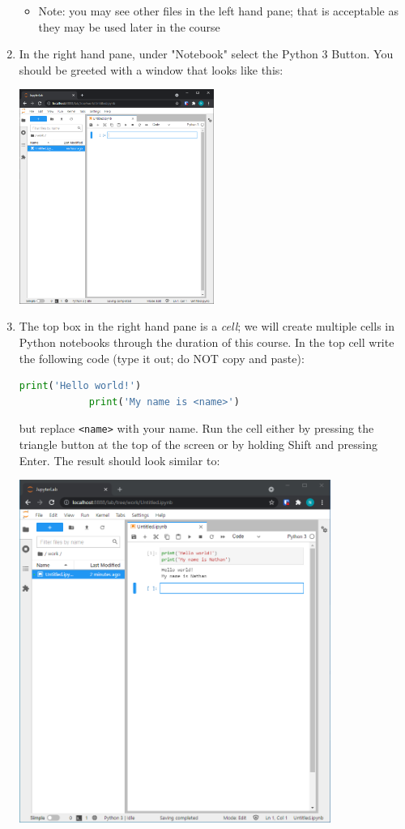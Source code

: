 \documentclass[letterpaper,10pt]{article}
\begin{document}
\begin{enumerate}
\begin{center}
		\end{center}
		\begin{itemize}
			\item Note: you may see other files in the left hand pane; that is acceptable as they may be used later in the course
		\end{itemize}
	\item In the right hand pane, under "Notebook" select the Python 3 Button.  You should be greeted with a window that looks like this:
		\begin{center}
			\includegraphics[width=0.5\textwidth]{new_notebook.PNG}
		\end{center}
	\item The top box in the right hand pane is a \emph{cell}; we will create multiple cells in Python notebooks through the duration of this course.  In the top cell write the following code (type it out; do NOT copy and paste):
		\begin{lstlisting}[language=Python]
			print('Hello world!')
			print('My name is <name>')
		\end{lstlisting}
		but replace \texttt{<name>} with your name.  Run the cell either by pressing the triangle button at the top of the screen or by holding Shift and pressing Enter.  The result should look similar to:
		\begin{center}
			\includegraphics[width=0.8\textwidth]{hello_world.PNG}

\end{center}
\end{enumerate}
\end{document}
